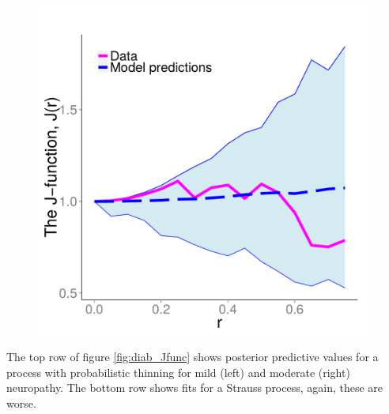 \documentclass{statsoc}
\begin{document}
\begin{figure}
\begin{minipage}[h]{0.74\linewidth}
\begin{minipage}[h]{0.49\linewidth}
  \end{minipage}
  \begin{minipage}[h]{0.49\linewidth}
  \centering
  \includegraphics[width=0.98\textwidth]{figs/Jfunc_postpred_R10/mod1_gibbs.pdf}
  \end{minipage}
  \end{minipage}
  \end{figure}
The top row of figure \ref{fig:diab_Jfunc} shows posterior predictive values for a \matern process with probabilistic thinning for
mild (left) and moderate (right) neuropathy. The bottom row shows fits for a Strauss process, again, these are worse.
\end{document}
